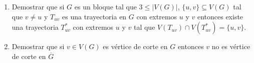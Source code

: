 \documentclass[12pt]{report}
\begin{document}
\begin{enumerate}


\item Demostrar que si $G$ es un bloque tal que $3 \leq |V(G)|$, $\{u,v\}\subseteq V(G)$ tal que $v \neq u$ y $T_{uv}$ es una trayectoria en $G$ con extremos $u$ y $v$ entonces existe una trayectoria $T_{uv}^{*}$ con extremos $u$ y $v$ tal que $V(T_{uv}) \cap V(T_{uv}^*) = \{u,v\}$.


\item Demostrar que si $v \in V(G)$ es vértice de corte en $G$ entonces $v$ no es vértice de corte en $\overline{G}$




\end{enumerate}
\end{document}
